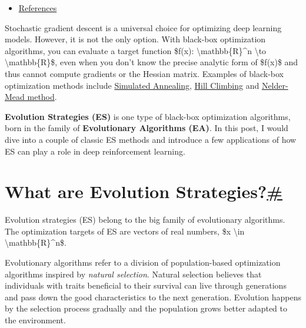 \begin{itemize}
  \begin{itemize}
  \tightlist
  \item
    \hyperref[hyperparameter-tuning-pbt]{Hyperparameter Tuning: PBT}
  \item
    \hyperref[network-topology-optimization-wann]{Network Topology Optimization: WANN}
  \end{itemize}
\item
  \hyperref[references]{References}
\end{itemize}

Stochastic gradient descent is a universal choice for optimizing deep learning models. However, it is not the only option. With black-box optimization algorithms, you can evaluate a target function \$f(x): \textbackslash mathbb\{R\}\^{}n \textbackslash to \textbackslash mathbb\{R\}\$, even when you don't know the precise analytic form of \$f(x)\$ and thus cannot compute gradients or the Hessian matrix. Examples of black-box optimization methods include \href{https://en.wikipedia.org/wiki/Simulated_annealing}{Simulated Annealing}, \href{https://en.wikipedia.org/wiki/Hill_climbing}{Hill Climbing} and \href{https://en.wikipedia.org/wiki/Nelder\%E2\%80\%93Mead_method}{Nelder-Mead method}.

\textbf{Evolution Strategies (ES)} is one type of black-box optimization algorithms, born in the family of \textbf{Evolutionary Algorithms (EA)}. In this post, I would dive into a couple of classic ES methods and introduce a few applications of how ES can play a role in deep reinforcement learning.

\section{\texorpdfstring{What are Evolution Strategies?\hyperref[what-are-evolution-strategies]{\#}}{What are Evolution Strategies?\#}}\label{what-are-evolution-strategies}

Evolution strategies (ES) belong to the big family of evolutionary algorithms. The optimization targets of ES are vectors of real numbers, \$x \textbackslash in \textbackslash mathbb\{R\}\^{}n\$.

Evolutionary algorithms refer to a division of population-based optimization algorithms inspired by \emph{natural selection}. Natural selection believes that individuals with traits beneficial to their survival can live through generations and pass down the good characteristics to the next generation. Evolution happens by the selection process gradually and the population grows better adapted to the environment.

